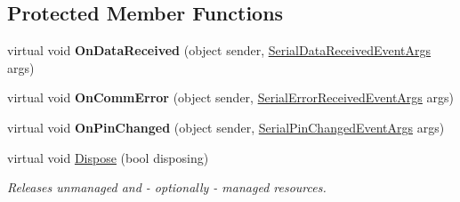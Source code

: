 \subsection*{Protected Member Functions}
\begin{DoxyCompactItemize}
\item 
\mbox{\label{class_r_j_c_p_1_1_i_o_1_1_ports_1_1_native_1_1_unix_native_serial_a4a64d64cb4df9f985d16333c410adedf}} 
virtual void {\bfseries On\+Data\+Received} (object sender, \mbox{\hyperlink{class_r_j_c_p_1_1_i_o_1_1_ports_1_1_serial_data_received_event_args}{Serial\+Data\+Received\+Event\+Args}} args)
\item 
\mbox{\label{class_r_j_c_p_1_1_i_o_1_1_ports_1_1_native_1_1_unix_native_serial_a41c5d911b28ac8455d1b7833c896b70e}} 
virtual void {\bfseries On\+Comm\+Error} (object sender, \mbox{\hyperlink{class_r_j_c_p_1_1_i_o_1_1_ports_1_1_serial_error_received_event_args}{Serial\+Error\+Received\+Event\+Args}} args)
\item 
\mbox{\label{class_r_j_c_p_1_1_i_o_1_1_ports_1_1_native_1_1_unix_native_serial_a31e98f4552135bcc7a7efdca051de56b}} 
virtual void {\bfseries On\+Pin\+Changed} (object sender, \mbox{\hyperlink{class_r_j_c_p_1_1_i_o_1_1_ports_1_1_serial_pin_changed_event_args}{Serial\+Pin\+Changed\+Event\+Args}} args)
\item 
virtual void \mbox{\hyperlink{class_r_j_c_p_1_1_i_o_1_1_ports_1_1_native_1_1_unix_native_serial_a9443132cdda093e01bc428f852e24afd}{Dispose}} (bool disposing)
\begin{DoxyCompactList}\small\item\em Releases unmanaged and -\/ optionally -\/ managed resources. \end{DoxyCompactList}\end{DoxyCompactItemize}
